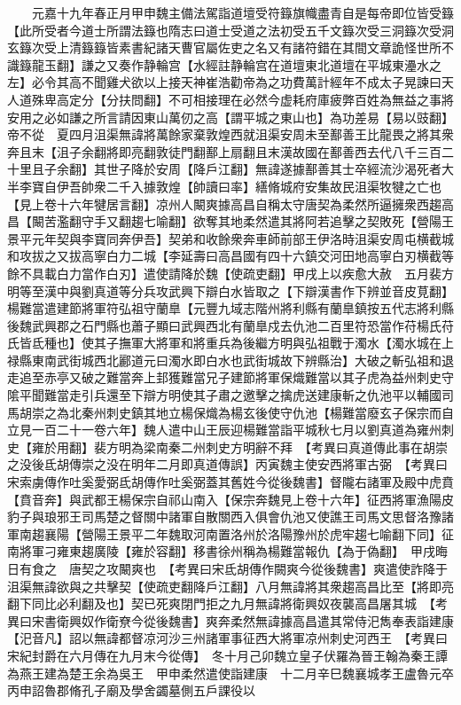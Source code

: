 　　元嘉十九年春正月甲申魏主備法駕詣道壇受符籙旗幟盡青自是每帝即位皆受籙【此所受者今道士所謂法籙也隋志曰道士受道之法初受五千文籙次受三洞籙次受洞玄籙次受上清籙籙皆素書紀諸天曹官屬佐吏之名又有諸符錯在其間文章詭怪世所不識籙龍玉翻】謙之又奏作静輪宫【水經註静輪宫在道壇東北道壇在平城東灅水之左】必令其高不聞雞犬欲以上接天神崔浩勸帝為之功費萬計經年不成太子晃諫曰天人道殊卑高定分【分扶問翻】不可相接理在必然今虚耗府庫疲弊百姓為無益之事將安用之必如謙之所言請因東山萬仞之高【謂平城之東山也】為功差易【易以豉翻】帝不從　夏四月沮渠無諱將萬餘家棄敦煌西就沮渠安周未至鄯善王比龍畏之將其衆奔且末【沮子余翻將即亮翻敦徒門翻鄯上扇翻且末漢故國在鄯善西去代八千三百二十里且子余翻】其世子降於安周【降戶江翻】無諱遂據鄯善其士卒經流沙渴死者大半李寶自伊吾帥衆二千入據敦煌【帥讀曰率】繕脩城府安集故民沮渠牧犍之亡也【見上卷十六年犍居言翻】凉州人闞爽據高昌自稱太守唐契為柔然所逼擁衆西趨高昌【闞苦濫翻守手又翻趨七喻翻】欲奪其地柔然遣其將阿若追擊之契敗死【營陽王景平元年契與李寶同奔伊吾】契弟和收餘衆奔車師前部王伊洛時沮渠安周屯横截城和攻拔之又拔高寧白力二城【李延壽曰高昌國有四十六鎮交河田地高寧白刃横截等餘不具載白力當作白刃】遣使請降於魏【使疏吏翻】甲戌上以疾愈大赦　五月裴方明等至漢中與劉真道等分兵攻武興下辯白水皆取之【下辯漢書作下辨並音皮莧翻】楊難當遣建節將軍符弘祖守蘭臯【元豐九域志階州將利縣有蘭臯鎮按五代志將利縣後魏武興郡之石門縣也蕭子顯曰武興西北有蘭臯戍去仇池二百里符恐當作苻楊氏苻氏皆氐種也】使其子撫軍大將軍和將重兵為後繼方明與弘祖戰于濁水【濁水城在上禄縣東南武街城西北酈道元曰濁水即白水也武街城故下辨縣治】大破之斬弘祖和退走追至赤亭又破之難當奔上邽獲難當兄子建節將軍保熾難當以其子虎為益州刺史守隂平聞難當走引兵還至下辯方明使其子肅之邀擊之擒虎送建康斬之仇池平以輔國司馬胡崇之為北秦州刺史鎮其地立楊保熾為楊玄後使守仇池【楊難當廢玄子保宗而自立見一百二十一卷六年】魏人遣中山王辰迎楊難當詣平城秋七月以劉真道為雍州刺史【雍於用翻】裴方明為梁南秦二州刺史方明辭不拜　【考異曰真道傳此事在胡崇之没後氐胡傳崇之没在明年二月即真道傳誤】丙寅魏主使安西將軍古弼　【考異曰宋索虜傳作吐奚愛弼氐胡傳作吐奚弼蓋其舊姓今從後魏書】督隴右諸軍及殿中虎賁【賁音奔】與武都王楊保宗自祁山南入【保宗奔魏見上卷十六年】征西將軍漁陽皮豹子與琅邪王司馬楚之督關中諸軍自散關西入俱會仇池又使譙王司馬文思督洛豫諸軍南趨襄陽【營陽王景平二年魏取河南置洛州於洛陽豫州於虎牢趨七喻翻下同】征南將軍刁雍東趨廣陵【雍於容翻】移書徐州稱為楊難當報仇【為于偽翻】　甲戌晦日有食之　唐契之攻闞爽也　【考異曰宋氐胡傳作闕爽今從後魏書】爽遣使詐降于沮渠無諱欲與之共擊契【使疏吏翻降戶江翻】八月無諱將其衆趨高昌比至【將即亮翻下同比必利翻及也】契已死爽閉門拒之九月無諱將衛興奴夜襲高昌屠其城　【考異曰宋書衛興奴作衛尞今從後魏書】爽奔柔然無諱據高昌遣其常侍汜雋奉表詣建康【汜音凡】詔以無諱都督凉河沙三州諸軍事征西大將軍凉州刺史河西王　【考異曰宋紀封爵在六月傳在九月末今從傳】　冬十月己卯魏立皇子伏羅為晉王翰為秦王譚為燕王建為楚王余為吳王　甲申柔然遣使詣建康　十二月辛巳魏襄城孝王盧魯元卒丙申詔魯郡脩孔子廟及學舍蠲墓側五戶課役以

